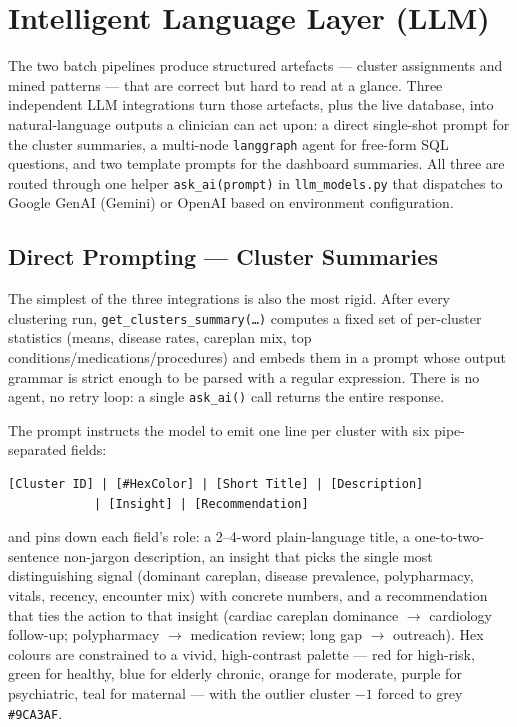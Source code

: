 \section{Intelligent Language Layer (LLM)}
\label{sec:llm}

The two batch pipelines produce structured artefacts --- cluster assignments and mined patterns --- that are correct but hard to read at a glance. Three independent LLM integrations turn those artefacts, plus the live database, into natural-language outputs a clinician can act upon: a direct single-shot prompt for the cluster summaries, a multi-node \texttt{langgraph} agent for free-form SQL questions, and two template prompts for the dashboard summaries. All three are routed through one helper \texttt{ask\_ai(prompt)} in \texttt{llm\_models.py} that dispatches to Google GenAI (Gemini) or OpenAI based on environment configuration.

\subsection{Direct Prompting --- Cluster Summaries}
\label{subsec:cluster-llm}

The simplest of the three integrations is also the most rigid. After every clustering run, \texttt{get\_clusters\_summary(\ldots)} computes a fixed set of per-cluster statistics (means, disease rates, careplan mix, top conditions/medications/procedures) and embeds them in a prompt whose output grammar is strict enough to be parsed with a regular expression. There is no agent, no retry loop: a single \texttt{ask\_ai()} call returns the entire response.

The prompt instructs the model to emit one line per cluster with six pipe-separated fields:
\begin{verbatim}
[Cluster ID] | [#HexColor] | [Short Title] | [Description]
            | [Insight] | [Recommendation]
\end{verbatim}
and pins down each field's role: a 2--4-word plain-language title, a one-to-two-sentence non-jargon description, an insight that picks the single most distinguishing signal (dominant careplan, disease prevalence, polypharmacy, vitals, recency, encounter mix) with concrete numbers, and a recommendation that ties the action to that insight (cardiac careplan dominance $\to$ cardiology follow-up; polypharmacy $\to$ medication review; long gap $\to$ outreach). Hex colours are constrained to a vivid, high-contrast palette --- red for high-risk, green for healthy, blue for elderly chronic, orange for moderate, purple for psychiatric, teal for maternal --- with the outlier cluster $-1$ forced to grey \texttt{\#9CA3AF}.

